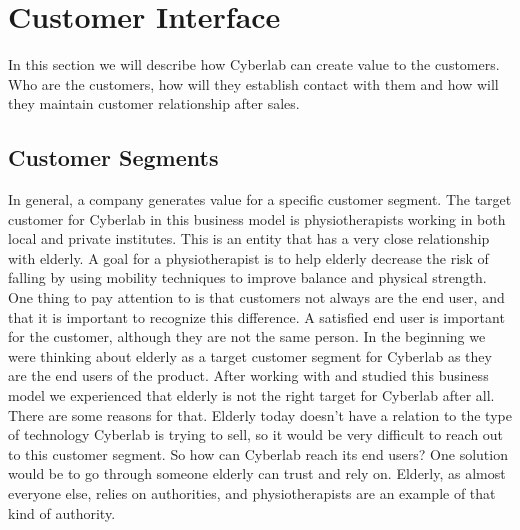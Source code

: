\section{Customer Interface}
In this section we will describe how Cyberlab can create value to the customers. Who are the customers, how will they establish contact with them and how will they maintain customer relationship after sales.
\subsection{Customer Segments}
In general, a company generates value for a specific customer segment. The target customer for Cyberlab in this business model is physiotherapists working in both local and private institutes.  This is an entity that has a very close relationship with elderly. A goal for a physiotherapist is to help elderly decrease the risk of falling by using mobility techniques to improve balance and physical strength. One thing to pay attention to is that customers not always are the end user, and that it is important to recognize this difference. A satisfied end user is important for the customer, although they are not the same person. In the beginning we were thinking about elderly as a target customer segment for Cyberlab as they are the end users of the product. After working with and studied this business model we experienced that elderly is not the right target for Cyberlab after all. There are some reasons for that. Elderly today doesn’t have a relation to the type of technology Cyberlab is trying to sell, so it would be very difficult to reach out to this customer segment. So how can Cyberlab reach its end users?  One solution would be to go through someone elderly can trust and rely on. Elderly, as almost everyone else, relies on authorities, and physiotherapists are an example of that kind of authority.  
